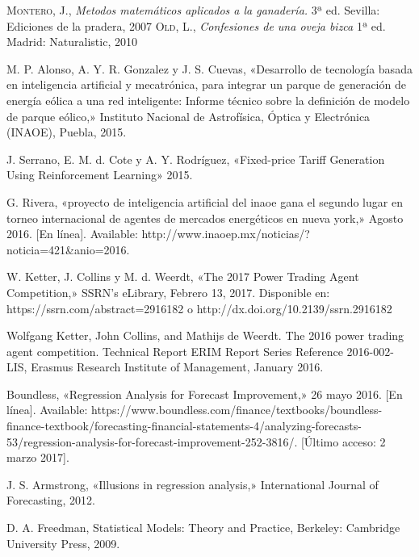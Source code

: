 \renewcommand{\refname}{Bibliografía}
\begin{thebibliography}{a}
	 \textsc{Montero, J.}, \textit{Metodos matemáticos aplicados a la ganadería.} 3ª ed. Sevilla: Ediciones de la pradera, 2007  
	 \textsc{Old, L.}, \textit{Confesiones de una oveja bizca} 1ª ed. Madrid: Naturalistic, 2010 

	 M. P. Alonso, A. Y. R. Gonzalez y J. S. Cuevas, «Desarrollo de tecnología basada en inteligencia artificial y mecatrónica, para integrar un parque de generación de energía eólica a una red inteligente: Informe técnico sobre la definición de modelo de parque eólico,» Instituto Nacional de Astrofísica, Óptica y Electrónica (INAOE), Puebla, 2015.
	
	 J. Serrano, E. M. d. Cote y A. Y. Rodríguez, «Fixed-price Tariff Generation Using Reinforcement
Learning» 2015.

	 G. Rivera, «proyecto de inteligencia artificial del inaoe gana el segundo lugar en torneo
internacional de agentes de mercados energéticos en nueva york,» Agosto 2016. [En línea].
Available: http://www.inaoep.mx/noticias/?noticia=421\&anio=2016.

	 W. Ketter, J. Collins y M. d. Weerdt, «The 2017 Power Trading Agent Competition,» SSRN's eLibrary, Febrero 13, 2017. 
	Disponible en: https://ssrn.com/abstract=2916182 o http://dx.doi.org/10.2139/ssrn.2916182

	 Wolfgang Ketter, John Collins, and Mathijs de Weerdt. The 2016 power trading agent competition. Technical Report ERIM Report Series Reference 2016-002-LIS, Erasmus Research
Institute of Management, January 2016.

	Boundless, «Regression Analysis for Forecast Improvement,» 26 mayo 2016. [En línea].
Available: https://www.boundless.com/finance/textbooks/boundless-finance-textbook/forecasting-financial-statements-4/analyzing-forecasts-53/regression-analysis-for-forecast-improvement-252-3816/. [Último acceso: 2 marzo 2017].

	 J. S. Armstrong, «Illusions in regression analysis,» International Journal of Forecasting, 2012.

	 D. A. Freedman, Statistical Models: Theory and Practice, Berkeley: Cambridge University Press, 2009.
		

\end{thebibliography}
